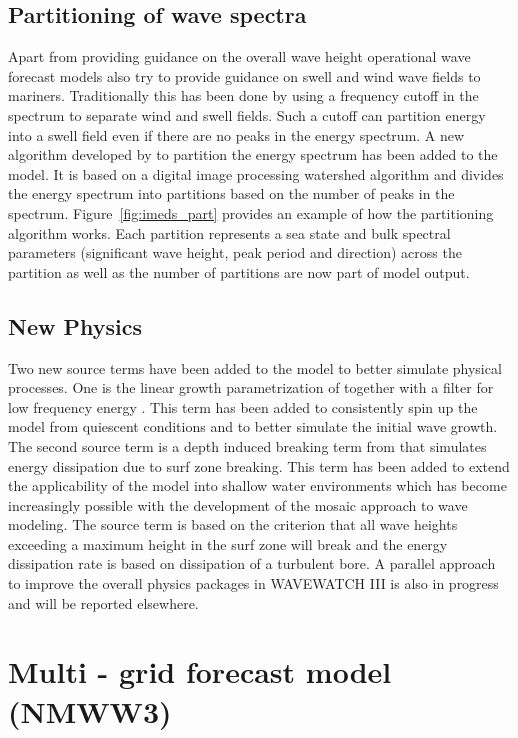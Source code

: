 \documentclass[12pt]{article}
\begin{document}
\subsection{Partitioning of wave spectra}
\label{sec:PRT}

Apart from providing guidance on the overall wave height operational
wave forecast models also try to provide guidance on swell and wind
wave fields to mariners. Traditionally this has been done by using a
frequency cutoff in the spectrum to separate wind and swell
fields. Such a cutoff can partition energy into a swell field even if
there are no peaks in the energy spectrum. A new algorithm developed
by \cite{hanson-04,hansonetal-09} to partition the energy spectrum has
been added to the model. It is based on a digital image processing
watershed algorithm \cite[]{vincent-91} and divides the energy
spectrum into partitions based on the number of peaks in the
spectrum. Figure~\ref{fig:imeds_part} provides an example of how the
partitioning algorithm works. Each partition represents a sea state
and bulk spectral parameters (significant wave height, peak period and
direction) across the partition as well as the number of partitions
are now part of model output.

\subsection{New Physics}

Two new source terms have been added to the model to better simulate
physical processes. One is the linear growth parametrization of
\cite{cavaleri-81} together with a filter for low frequency energy
\cite[]{tolman-92}. This term has been added to consistently spin up
the model from quiescent conditions and to better simulate the initial
wave growth. The second source term is a depth induced breaking term
from \cite{battjes-78} that simulates energy dissipation due to surf
zone breaking. This term has been added to extend the applicability of
the model into shallow water environments which has become
increasingly possible with the development of the mosaic approach to
wave modeling. The source term is based on the criterion that all wave
heights exceeding a maximum height in the surf zone will break and the
energy dissipation rate is based on dissipation of a turbulent bore. A
parallel approach to improve the overall physics packages in WAVEWATCH
III is also in progress and will be reported elsewhere.

\section{Multi - grid forecast model (NMWW3)}
\label{sec:NMWW3}
\end{document}
